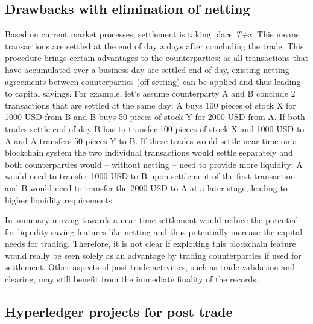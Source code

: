\subsection{Drawbacks with elimination of netting}
Based on current market processes, settlement is taking place \emph{T+x}. This means transactions are settled at the end of day \emph{x} days after concluding the trade. This procedure brings certain advantages to the counterparties: as all transactions that have accumulated over a business day are settled end-of-day, existing netting agreements between counterparties (off-setting) can be applied and thus leading to capital savings. For example, let’s assume counterparty A and B conclude 2 transactions that are settled at the same day: A buys 100 pieces of stock X for 1000 USD from B and B buys 50 pieces of stock Y for 2000 USD from A. If both trades settle end-of-day B has to transfer 100 pieces of stock X and 1000 USD to A and A transfers 50 pieces Y to B. If these trades would settle near-time on a blockchain system the two individual transactions would settle separately and both counterparties would – without netting – need to provide more liquidity: A would need to transfer 1000 USD to B upon settlement of the first transaction and B would need to transfer the 2000 USD to A at a later stage, leading to higher liquidity requirements.

In summary moving towards a near-time settlement would reduce the potential for liquidity saving features like netting and thus potentially increase the capital needs for trading. Therefore, it is not clear if exploiting this blockchain feature would really be seen solely as an advantage by trading counterparties if used for settlement. Other aspects of post trade activities, such as trade validation and clearing, may still benefit from the immediate finality of the records. 

\subsection{Hyperledger projects for post trade}
